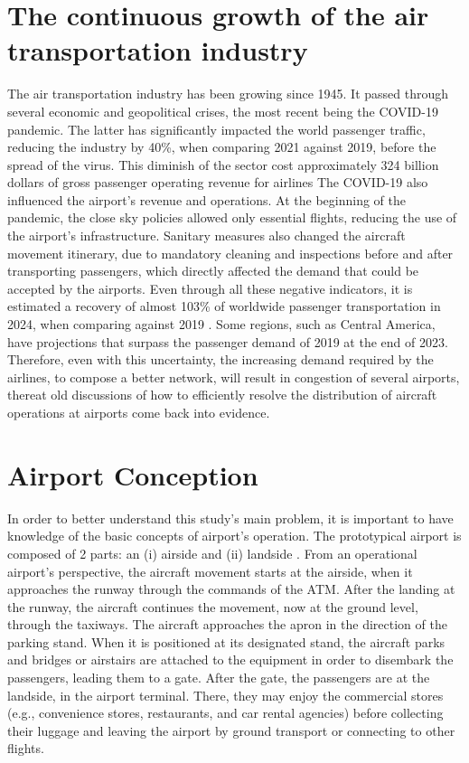 
\label{section:Introduction}

\section{The continuous growth of the air transportation industry}%
\label{grow}

The air transportation industry has been growing since 1945. It passed through several economic and geopolitical crises, the most recent being the COVID-19 pandemic. The latter has significantly impacted the world passenger traffic, reducing the industry by 40\%, when comparing 2021 against 2019, before the spread of the virus. This diminish of the sector cost approximately 324 billion dollars of gross passenger operating revenue for airlines \cite{ICAOEconomicImpact} The COVID-19 also influenced the airport's revenue and operations. At the beginning of the pandemic, the close sky policies allowed only essential flights, reducing the use of the airport's infrastructure. Sanitary measures also changed the aircraft movement itinerary, due to mandatory cleaning and inspections before and after transporting passengers, which directly affected the demand that could be accepted by the airports. Even through all these negative indicators, it is estimated a recovery of almost 103\% of worldwide passenger transportation in 2024, when comparing against 2019 \cite{IATA2024}. Some regions, such as Central America, have projections that surpass the passenger demand of 2019 at the end of 2023. Therefore, even with this uncertainty, the increasing demand required by the airlines, to compose a better network, will result in congestion of several airports, thereat old discussions of how to efficiently resolve the distribution of aircraft operations at airports come back into evidence.

\section{Airport Conception}
\label{concep}

In order to better understand this study's main problem, it is important to have knowledge of the basic concepts of airport’s operation. The prototypical airport is composed of 2 parts: an (i) airside and (ii) landside \cite{Lance2009}. From an operational airport’s perspective, the aircraft movement starts at the airside, when it approaches the runway through the commands of the \acrfull{ATM}. After the landing at the runway, the aircraft continues the movement, now at the ground level, through the taxiways. The aircraft approaches the apron in the direction of the parking stand. When it is positioned at its designated stand, the aircraft parks and bridges or airstairs are attached to the equipment in order to disembark the passengers, leading them to a gate. After the gate, the passengers are at the landside, in the airport terminal. There, they may enjoy the commercial stores (e.g., convenience stores, restaurants, and car rental agencies) before collecting their luggage and leaving the airport by ground transport or connecting to other flights. 

